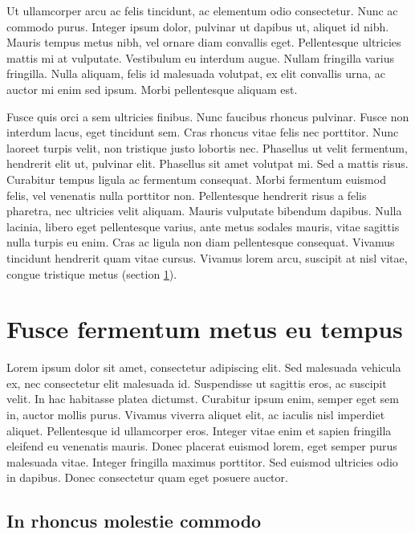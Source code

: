 \documentclass[]{scrartcl}
\begin{document}
	Ut ullamcorper arcu ac felis tincidunt, ac elementum odio consectetur. Nunc ac commodo purus. Integer ipsum dolor, pulvinar ut dapibus ut, aliquet id nibh. Mauris tempus metus nibh, vel ornare diam convallis eget. Pellentesque ultricies mattis mi at vulputate. Vestibulum eu interdum augue. Nullam fringilla varius fringilla. Nulla aliquam, felis id malesuada volutpat, ex elit convallis urna, ac auctor mi enim sed ipsum. Morbi pellentesque aliquam est.
	
	Fusce quis orci a sem ultricies finibus. Nunc faucibus rhoncus pulvinar. Fusce non interdum lacus, eget tincidunt sem. Cras rhoncus vitae felis nec porttitor. Nunc laoreet turpis velit, non tristique justo lobortis nec. Phasellus ut velit fermentum, hendrerit elit ut, pulvinar elit. Phasellus sit amet volutpat mi. Sed a mattis risus. Curabitur tempus ligula ac fermentum consequat. Morbi fermentum euismod felis, vel venenatis nulla porttitor non. Pellentesque hendrerit risus a felis pharetra, nec ultricies velit aliquam. Mauris vulputate bibendum dapibus. Nulla lacinia, libero eget pellentesque varius, ante metus sodales mauris, vitae sagittis nulla turpis eu enim. Cras ac ligula non diam pellentesque consequat. Vivamus tincidunt hendrerit quam vitae cursus. Vivamus lorem arcu, suscipit at nisl vitae, congue tristique metus (section \ref{part:Fusce}). 

\section{Fusce fermentum metus eu tempus}
\label{part:Fusce}
	
	Lorem ipsum dolor sit amet, consectetur adipiscing elit. Sed malesuada vehicula ex, nec consectetur elit malesuada id. Suspendisse ut sagittis eros, ac suscipit velit. In hac habitasse platea dictumst. Curabitur ipsum enim, semper eget sem in, auctor mollis purus. Vivamus viverra aliquet elit, ac iaculis nisl imperdiet aliquet. Pellentesque id ullamcorper eros. Integer vitae enim et sapien fringilla eleifend eu venenatis mauris. Donec placerat euismod lorem, eget semper purus malesuada vitae. Integer fringilla maximus porttitor. Sed euismod ultricies odio in dapibus. Donec consectetur quam eget posuere auctor.
	
	\subsection{In rhoncus molestie commodo}
	
\end{document}
